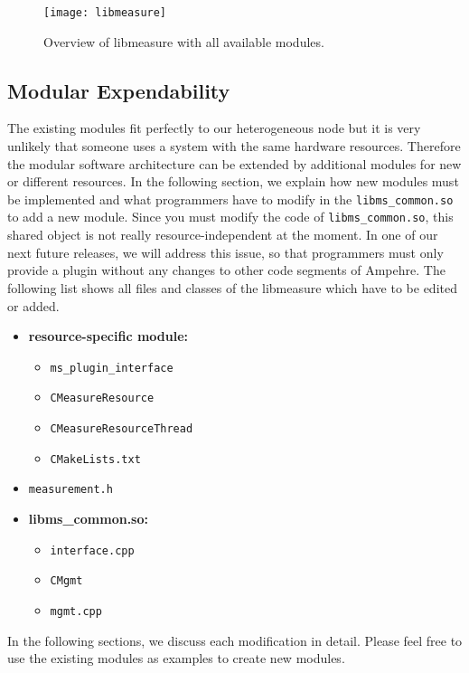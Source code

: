 \begin{figure}
\begin{center}
\texttt{[image: libmeasure]} 
\caption{Overview of libmeasure with all available modules.}
\label{fig:libmeasure_overview}
\end{center}
\end{figure}

\pagebreak

\subsection{Modular Expendability}
The existing modules fit perfectly to our heterogeneous node but it is very unlikely that someone uses a system with the same hardware resources. Therefore the modular software architecture can be extended by additional modules for new or different resources. In the following section, we explain how new modules must be implemented and what programmers have to modify in the \texttt{libms\_common.so} to add a new module. Since you must modify the code of \texttt{libms\_common.so}, this shared object is not really resource-independent at the moment. In one of our next future releases, we will address this issue, so that programmers must only provide a plugin without any changes to other code segments of Ampehre. The following list shows all files and classes of the libmeasure which have to be edited or added.

\begin{itemize}
	\item \textbf{resource-specific module:}
	\begin{itemize}
		\item \texttt{ms\_plugin\_interface}
		\item \texttt{CMeasureResource}
		\item \texttt{CMeasureResourceThread}
		\item \texttt{CMakeLists.txt}
	\end{itemize}
	\item \texttt{measurement.h}
	\item \textbf{libms\_common.so:}
	\begin{itemize}
		\item \texttt{interface.cpp}
		\item \texttt{CMgmt}
		\item \texttt{mgmt.cpp} 
	\end{itemize}
\end{itemize}
In the following sections, we discuss each modification in detail. Please feel free to use the existing modules as examples to create new modules.

